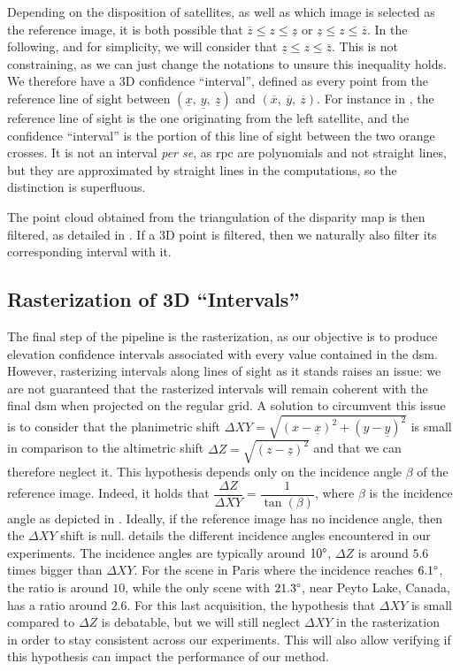 Depending on the disposition of satellites, as well as which image is selected as the reference image, it is both possible that $\overline{z}\leqslant z \leqslant \underline{z}$ or $\underline{z}\leqslant z \leqslant \overline{z}$. In the following, and for simplicity, we will consider that $\underline{z}\leqslant z \leqslant \overline{z}$. This is not constraining, as we can just change the notations to unsure this inequality holds. We therefore have a 3D confidence ``interval'', defined as every point from the reference line of sight between $(\underline{x}, ~\underline{y}, ~\underline{z})$ and $(\overline{x}, ~\overline{y}, ~\overline{z})$. For instance in , the reference line of sight is the one originating from the left satellite, and the confidence ``interval'' is the portion of this line of sight between the two orange crosses. It is not an interval \textit{per se}, as \acrshort{rpc} are polynomials and not straight lines, but they are approximated by straight lines in the computations, so the distinction is superfluous. 

The point cloud obtained from the triangulation of the disparity map is then filtered, as detailed in . If a 3D point is filtered, then we naturally also filter its corresponding interval with it. 

\subsection{Rasterization of 3D ``Intervals''}
The final step of the pipeline is the rasterization, as our objective is to produce elevation confidence intervals associated with every value contained in the \acrshort{dsm}. However, rasterizing intervals along lines of sight as it stands raises an issue: we are not guaranteed that the rasterized intervals will remain coherent with the final \acrshort{dsm} when projected on the regular grid. A solution to circumvent this issue is to consider that the planimetric shift $\Delta XY=\sqrt{(x-\underline{x})^2+(y-\underline{y})^2}$ is small in comparison to the altimetric shift $\Delta Z=\sqrt{(z-\underline{z})^2}$ and that we can therefore neglect it. This hypothesis depends only on the incidence angle $\beta$ of the reference image. Indeed, it holds that $\dfrac{\Delta Z}{\Delta XY}=\dfrac{1}{\tan(\beta)}$, where $\beta$ is the incidence angle as depicted in . Ideally, if the reference image has no incidence angle, then the $\Delta XY$ shift is null.  details the different incidence angles encountered in our experiments. The incidence angles are typically around $10\degree$, \ie $\Delta Z$ is around $5.6$ times bigger than $\Delta XY$. For the scene in Paris where the incidence reaches $6.1\degree$, the ratio is around $10$, while the only scene with $21.3\degree$, near Peyto Lake, Canada, has a ratio around $2.6$. For this last acquisition, the hypothesis that $\Delta XY$ is small compared to $\Delta Z$ is debatable, but we will still neglect $\Delta XY$ in the rasterization in order to stay consistent across our experiments. This will also allow verifying if this hypothesis can impact the performance of our method.

